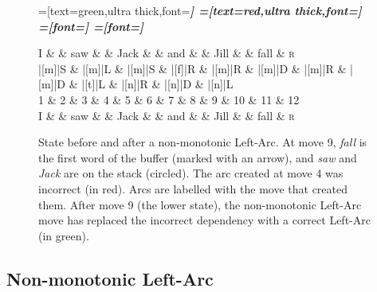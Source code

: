 \documentclass[11pt,letterpaper]{article}
\begin{document}
\begin{figure}
    \centering
    \begin{dependency}[theme=simple]
        =[text=green,ultra thick,font=\bfseries\itshape]
        =[text=red,ultra thick,font=\bfseries\itshape]
        =[font=\bfseries\itshape]
        =[font=\itshape]

        \begin{deptext}[column sep=.075cm, row sep=.1ex]
            I \&           \& saw \&          \& Jack       \& \& and     \&           \& Jill   \&  \& fall \& \textsc{r} \\
|[m]|S \& |[m]|L \& |[m]|S   \& |[f]|R \& |[m]|R \& |[m]|D \& |[m]|R \& |[m]|D \& |[t]|L \& |[n]|R \& |[n]|D \& |[n]|L \\
            1 \&     2       \& 3  \&   4      \& 5          \& 6 \& 7     \& 8 \& 9 \& 10 \& 11 \& 12 \\
    I \&           \& saw \&          \& Jack       \& \& and     \&           \& Jill   \&      \& fall \& \textsc{r} \\
        \end{deptext}
    
    
\end{dependency}
\caption{
\small
    State before and after a non-monotonic Left-Arc.
    At move 9, \emph{fall} is the first word of the buffer (marked with an arrow),
    and \emph{saw} and \emph{Jack} are on the stack (circled). The arc created at move 4 was
    incorrect (in red). Arcs are labelled with the move that created them.
    After move 9 (the lower state), the non-monotonic Left-Arc move
    has replaced the incorrect dependency with a correct Left-Arc (in green).
\label{fig:clobber}}
\vspace{-0.5\baselineskip}
\end{figure}


\subsection{Non-monotonic Left-Arc}
\end{document}
